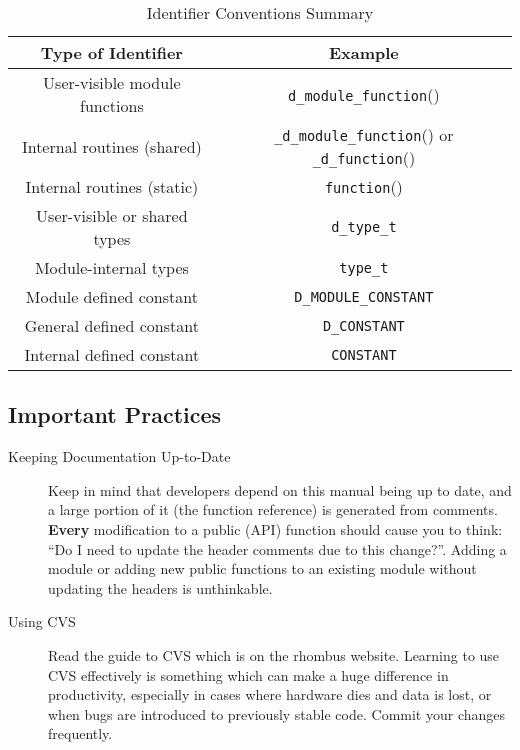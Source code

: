 \begin{table}
\caption{Identifier Conventions Summary}
\label{tab:idconvsummary}
\begin{tabular}{|c|c|}
\hline
Type of Identifier & Example \\
\hline\hline
User-visible module functions & {\tt d\_module\_function}() \\
Internal routines (shared) & {\tt \_d\_module\_function}() or {\tt
\_d\_function}() \\
Internal routines (static) & {\tt function}() \\
User-visible or shared types & {\tt d\_type\_t} \\
Module-internal types & {\tt type\_t} \\
Module defined constant & {\tt D\_MODULE\_CONSTANT} \\
General defined constant & {\tt D\_CONSTANT} \\
Internal defined constant & {\tt CONSTANT} \\
\hline
\end{tabular}
\end{table}

\subsection{Important Practices}

\begin{description}
\item [Keeping Documentation Up-to-Date]
Keep in mind that developers depend on this manual being up to date, and a
large portion of it (the function reference) is generated from
comments. {\bf Every} modification to a public (API) function should
cause you to think: ``Do I need to update the header comments due to
this change?''. Adding a module or adding new public functions to an
existing module without updating the headers is unthinkable.

\item [Using CVS]
Read the guide to CVS which is on the rhombus website. Learning to
use CVS effectively is something which can make a huge difference in
productivity, especially in cases where hardware dies and data is
lost, or when bugs are introduced to previously stable code. Commit
your changes frequently.

\end{description}
